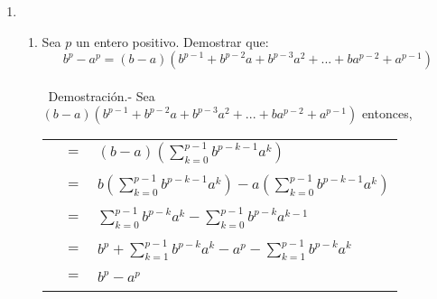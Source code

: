 \begin{enumerate}
\item 
\begin{enumerate}[\bfseries (a)]
\item Sea $p$ un entero positivo. Demostrar que:
$$b^p - a^p = (b-a)(b^{p-1} + b^{p-2}a + b^{p-3}a^2 + ... + ba^{p-2} + a^{p-1})$$\\\
Demostración.- \; Sea $(b-a)(b^{p-1} + b^{p-2}a + b^{p-3}a^2 + ... + ba^{p-2} + a^{p-1})$ entonces,
\begin{center}
\begin{tabular}{rcl}
&$=$&$(b-a)\left( \sum\limits_{k=0}^{p-1} b^{p-k-1} a^k \right)$\\\\
&$=$&$b \left( \sum\limits_{k=0}^{p-1} b^{p-k-1} a^k \right) - a\left( \sum\limits_{k=0}^{p-1} b^{p-k-1} a^k \right)$\\\\
&$=$&$ \sum\limits_{k=0}^{p-1} b^{p-k} a^k - \sum\limits_{k=0}^{p-1} b^{p-k} a^{k-1}  $\\\\
&$=$&$b^p + \sum\limits_{k=1}^{p-1} b^{p-k}a^k - a^p - \sum\limits_{k=1}^{p-1} b^{p-k}a^k$\\\\
&$=$&$b^p - a^p$\\\\
\end{tabular}
\end{center}


\end{enumerate}
\end{enumerate}
